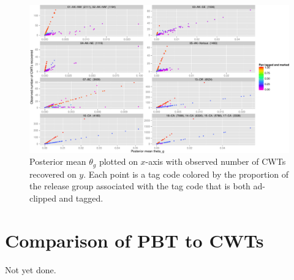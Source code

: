 \documentclass[11pt]{article}
\begin{document}
\begin{figure}
\begin{center}
\includegraphics[width=\textwidth]{images/post_mean_theta_v_counts_f_marked_times_p_marked.pdf}
\end{center}
\caption{Posterior mean $\theta_g$ plotted on $x$-axis with observed number of CWTs recovered on $y$.  Each point is a
tag code colored by the proportion of the release group associated with the tag code that is both ad-clipped and tagged.}
\end{figure}



\section{Comparison of PBT to CWTs \label{sec:compare}}

Not yet done.



 
\end{document}
